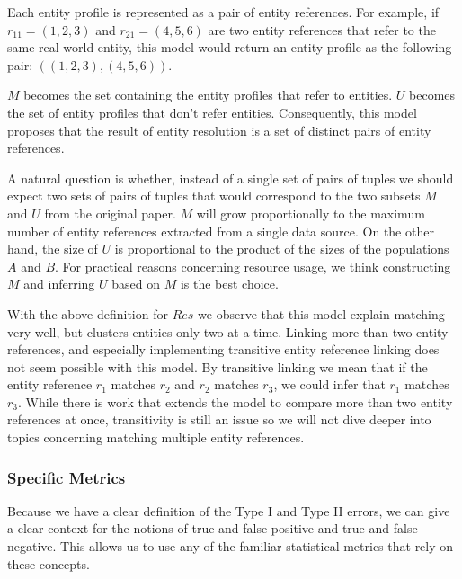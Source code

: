 \documentclass[journal]{IEEEtran}
\begin{document}
    Each entity profile is represented as a pair of entity references.
    For example, if $r_{11}=(1, 2, 3)$ and $r_{21}=(4, 5, 6)$ are two entity
    references that refer to the same real-world entity, this model would return
    an entity profile as the following pair: $((1, 2, 3), (4, 5, 6))$.

    $M$ becomes the set containing the entity profiles that refer to entities.
    $U$ becomes the set of entity profiles that don't refer entities.
    Consequently, this model proposes that the result of entity resolution is a
    set of distinct pairs of entity references.

    A natural question is whether, instead of a single set of pairs of tuples we
    should expect two sets of pairs of tuples that would correspond to the two
    subsets $M$ and $U$ from the original paper.
    $M$ will grow proportionally to the maximum number of entity references
    extracted from a single data source.
    On the other hand, the size of $U$ is proportional to the product of the
    sizes of the populations $A$ and $B$.
    For practical reasons concerning resource usage, we think constructing $M$
    and inferring $U$ based on $M$ is the best choice.

    With the above definition for $Res$ we observe that this model explain
    matching very well, but clusters entities only two at a time.
    Linking more than two entity references, and especially implementing
    transitive entity reference linking does not seem possible with this
    model\cite{Tal11}.
    By transitive linking we mean that if the entity reference $r_1$ matches
    $r_2$ and $r_2$ matches $r_3$, we could infer that $r_1$ matches $r_3$.
    While there is work that extends the model to compare more than two entity
    references\cite{Kon19} at once, transitivity is still an issue so we will
    not dive deeper into topics concerning matching multiple entity references.
    
    \subsubsection[fsm-metrics]{Specific Metrics}\label{subsubsec:fsm-metrics}

    Because we have a clear definition of the Type I and Type II errors, we can
    give a clear context for the notions of true and false positive and true and
    false negative.
    This allows us to use any of the familiar statistical metrics that rely on
    these concepts.
    
\end{document}
